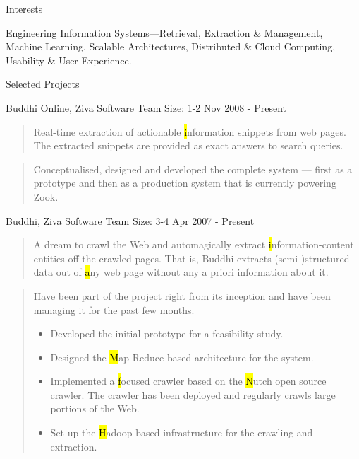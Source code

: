 \documentclass{resume}
\newcommand{\teamsize}{\hfill\sc\footnotesize Team Size: }
\begin{document}
\begin{category}{Interests}{}

    \item Engineering Information Systems---Retrieval, Extraction \&
    Management, Machine Learning, Scalable Architectures, Distributed \& Cloud
    Computing, Usability \& User Experience.

\end{category}


\begin{category}{Selected Projects}{}

    \item {\topic Buddhi Online,} Ziva Software
        {\teamsize 1-2}
        {\period Nov 2008 - Present}

        \begin{quote}
            Real-time extraction of actionable {\hl information snippets} from
            web pages. The extracted snippets are provided as exact answers to
            search queries.
        \end{quote}

        \begin{quote}
            Conceptualised, designed and developed the complete system ---
            first as a prototype and then as a production system that is
            currently powering Zook.
        \end{quote}

    \item {\topic Buddhi,} Ziva Software
        {\teamsize 3-4}
        {\period Apr 2007 - Present}

        \begin{quote}
            A dream to crawl the Web and automagically extract {\hl
            information-content entities} off the crawled pages.
            That is, Buddhi extracts (semi-)structured data out of {\hl
            any} web page without any a priori information about it.
        \end{quote}

        \begin{quote}
            Have been part of the project right from its inception and have
            been managing it for the past few months.
            \begin{itemize}
                \item Developed the initial prototype for a feasibility study.
                \item Designed the {\hl Map-Reduce} based architecture for the
                    system.
                \item Implemented a {\hl focused crawler} based on the {\hl
                    Nutch} open source crawler. The crawler has been deployed
                    and regularly crawls large portions of the Web.
                \item Set up the {\hl Hadoop} based infrastructure for the
                    crawling and extraction.
            \end{itemize}
        \end{quote}


\end{category}
\end{document}
